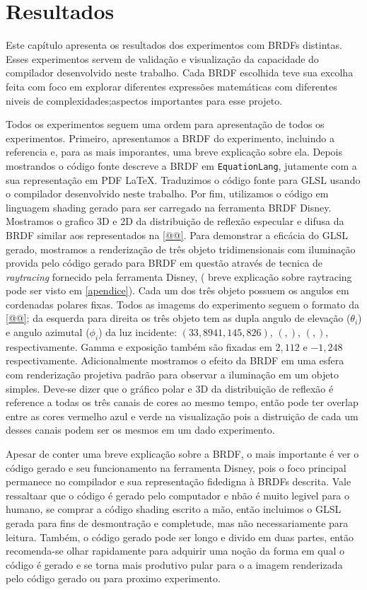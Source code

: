 \chapter{Resultados}
\label{chapter.resultados}


Este capítulo apresenta os resultados dos experimentos com BRDFs distintas. Esses experimentos servem de validação e visualização da capacidade do compilador desenvolvido neste trabalho. Cada BRDF escolhida teve sua excolha feita com foco em explorar diferentes expressões matemáticas com diferentes niveis de complexidades;aspectos importantes para esse projeto.

Todos os experimentos seguem uma ordem para apresentação de todos os experimentos. Primeiro, apresentamos a BRDF do experimento, incluindo a referencia e, para as mais imporantes, uma breve explicação sobre ela. Depois mostrandos o código fonte descreve a BRDF em \texttt{EquationLang}, jutamente com a sua representação em PDF \LaTeX. Traduzimos o código fonte para GLSL usando o compilador desenvolvido neste trabalho. Por fim, utilizamos o código em linguagem shading gerado para ser carregado na ferramenta BRDF Disney. Mostramos o grafico 3D e 2D da distribuição de reflexão especular e difusa da BRDF similar aos representados na \autoref{@@}. Para demonstrar a eficácia do GLSL gerado, mostramos a renderização de três objeto tridimensionais com iluminação provida pelo código gerado para BRDF em questão através de tecnica de \textit{raytracing} fornecido pela ferramenta Disney, ( breve explicação sobre raytracing pode ser visto em \autoref{apendice}). Cada um dos três objeto possuem os angulos em cordenadas polares fixas. Todos as imagems do experimento seguem o formato da \autoref{@@}; da esquerda para direita os três objeto tem as dupla angulo de elevação ($\theta_i$)  e angulo azimutal ($\phi_i$) da luz incidente: $\left(33,8941, 145,826\right)$, $\left( ,\right)$, $\left( ,\right)$, respectivamente. Gamma e exposição também são fixadas em $2,112$ e $-1,248$ respectivamente. Adicionalmente mostramos o efeito da BRDF em uma esfera com renderização projetiva padrão para observar a iluminação em um objeto simples.
Deve-se dizer que o gráfico polar e 3D da distribuição de reflexão é reference a todas os três canais de cores ao mesmo tempo, então pode ter overlap entre as cores vermelho azul e verde na visualização pois a distruição de cada um desses canais podem ser os mesmos em um dado experimento.



Apesar de conter uma breve explicação sobre a BRDF, o mais importante é ver o código gerado e seu funcionamento na ferramenta Disney, pois o foco principal permanece no compilador e sua representação fidedigna à BRDFs descrita.  Vale ressaltaar que o código é gerado pelo computador e nbão é muito legivel para o humano, se comprar a código shading escrito a mão, então incluimos o GLSL gerada para fins de desmontração e completude, mas não necessariamente para leitura. Também, o código gerado pode ser longo e divido em duas partes, então recomenda-se olhar rapidamente para adquirir uma noção da forma em qual o código é gerado e se torna mais produtivo pular para o a imagem renderizada pelo código gerado ou para proximo experimento.

